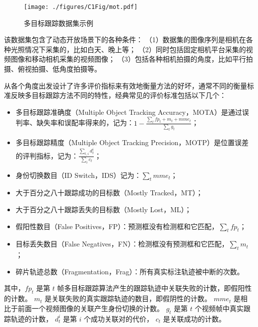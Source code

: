 \begin{figure*}[ht]
	\centering
	\texttt{[image: ./figures/C1Fig/mot.pdf]}
	\caption{多目标跟踪数据集示例}
	\label{fig:c1:mot}
\end{figure*}

该数据集包含了动态开放场景下的各种条件：
（1）数据集的图像序列是相机在各种光照情况下采集的，比如白天、晚上等；
（2）同时包括固定相机平台采集的视频图像和移动相机采集的视频图像；
（3）包括各种相机拍摄的角度，比如平行拍摄、俯视拍摄、低角度拍摄等。



从各个角度出发设计了许多评价指标来有效地衡量方法的好坏，通常不同的衡量标准反映多目标跟踪方法不同的特性，经典常见的评价标准包括以下几个：
\begin{itemize}
	\item 多目标跟踪准确度（Multiple  Object Tracking Accuracy，MOTA）是通过误判率、缺失率和误配率得来的，记为：$1 - \frac{\sum_t fp_t + m_t + mme_t}{\sum_t g_t}$；
	
	\item 多目标跟踪精度（Multiple  Object Tracking Precision，MOTP）是位置误差的评判指标，记为：$\frac{\sum_{t,i} d_t^i}{\sum_i c_t}$；
	
	\item 身份切换数目（ID Switch，IDS）记为：$\sum_t{mme_t}$；
	
	\item 大于百分之八十跟踪成功的目标数（Mostly Tracked，MT）；
	
	\item 大于百分之八十跟踪丢失的目标数（Mostly Lost，ML）；
	
	\item 假阳性数目（False Positives，FP）：预测框没有检测框和它匹配，$\sum_{t}{fp_t}$；
	
	\item 目标丢失数目（False Negatives，FN）：检测框没有预测框和它匹配，$\sum_t{m_t}$；
	
	\item 碎片轨迹总数（Fragmentation，Frag）：所有真实标注轨迹被中断的次数。
\end{itemize}
其中，$fp_t$ 是第 $t$ 帧多目标跟踪算法产生的跟踪轨迹中关联失败的计数，即假阳性的计数。
$m_t$ 是关联失败的真实跟踪轨迹的数目，即假阴性的计数。
$mme_t$ 是相比于前面一个视频图像的关联产生身份切换的计数。
$g_t$ 是第 $t$ 个视频帧中真实跟踪轨迹的计数，
$d_t^i$ 是第 $i$ 个成功关联对的代价，
$c_t$ 是关联成功的计数。




